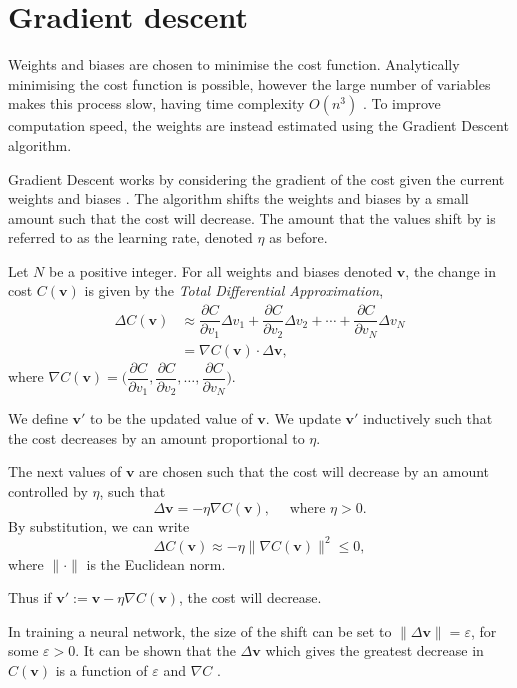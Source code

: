 \section{Gradient descent}\label{nnets-graddesc}

Weights and biases are chosen to minimise the cost function. Analytically minimising the cost function is possible, however the large number of variables makes this process slow, having time complexity $O(n^3)$ \cite{Marquardt1963}. To improve computation speed, the weights are instead estimated using the Gradient Descent algorithm.

Gradient Descent works by considering the gradient of the cost given the current weights and biases \cite{Nielson2015}. The algorithm shifts the weights and biases by a small amount such that the cost will decrease. The amount that the values shift by is referred to as the learning rate, denoted $\eta$ as before.

Let $N$ be a positive integer. For all weights and biases denoted $\mathbf{v}$, the change in cost $C(\mathbf{v})$ is given by the \textit{Total Differential Approximation},
\begin{align*}
	\Delta C(\mathbf{v}) & \approx \dfrac{\partial C}{\partial v_1}\Delta v_1 + \dfrac{\partial C}{\partial v_2}\Delta v_2 + \cdots + \dfrac{\partial C}{\partial v_N}\Delta v_N\\
	& = \nabla C(\mathbf{v})\cdot \Delta \mathbf{v},
\end{align*}
where $\nabla C(\mathbf{v}) = \Big(\dfrac{\partial C}{\partial v_1}, \dfrac{\partial C}{\partial v_2},\ldots, \dfrac{\partial C}{\partial v_N}\Big)$.

We define $\mathbf{v}'$ to be the updated value of $\mathbf{v}$. We update $\mathbf{v}'$ inductively such that the cost decreases by an amount proportional to $\eta$.

The next values of $\mathbf{v}$ are chosen such that the cost will decrease by an amount controlled by $\eta$, such that
\[
	\Delta\mathbf{v} = -\eta \nabla C(\mathbf{v}), \quad \text{ where }\eta > 0.
\]
By substitution, we can write
\[
	\Delta C(\mathbf{v}) \approx -\eta \|\nabla C(\mathbf{v})\|^2 \le 0,
\]
where $\|\cdot\|$ is the Euclidean norm.

Thus if $\mathbf{v}' := \mathbf{v} - \eta \nabla C(\mathbf{v})$, the cost will decrease.

In training a neural network, the size of the shift can be set to $\|\Delta\mathbf{v}\| = \varepsilon$, for some $\varepsilon > 0$. It can be shown that the $\Delta\mathbf{v}$ which gives the greatest decrease in $C(\mathbf{v})$ is a function of $\varepsilon$ and $\nabla C$ \cite{Nielson2015}.

